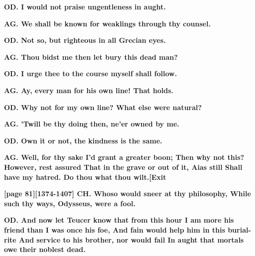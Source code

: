 \documentclass[11pt,letter]{book}
\begin{document}
\par \textbf{OD. I would not praise ungentleness in aught.}
\par 

\par \textbf{AG. We shall be known for weaklings through thy counsel.}
\par 

\par \textbf{OD. Not so, but righteous in all Grecian eyes.}
\par 

\par \textbf{AG. Thou bidst me then let bury this dead man?}
\par 

\par \textbf{OD. I urge thee to the course myself shall follow.}
\par 

\par \textbf{AG. Ay, every man for his own line! That holds.}
\par 

\par \textbf{OD. Why not for my own line? What else were natural?}
\par 

\par \textbf{AG. ’Twill be thy doing then, ne’er owned by me.}
\par 

\par \textbf{OD. Own it or not, the kindness is the same.}
\par 

\par \textbf{AG. Well, for thy sake I’d grant a greater boon; Then why not this? However, rest assured That in the grave or out of it, Aias still Shall have my hatred. Do thou what thou wilt.[Exit}
\par 

\par \textbf{[page 81][1374-1407] CH. Whoso would sneer at thy philosophy, While such thy ways, Odysseus, were a fool.}
\par 

\par \textbf{OD. And now let Teucer know that from this hour I am more his friend than I was once his foe, And fain would help him in this burial-rite And service to his brother, nor would fail In aught that mortals owe their noblest dead.}
\par 
\end{document}
